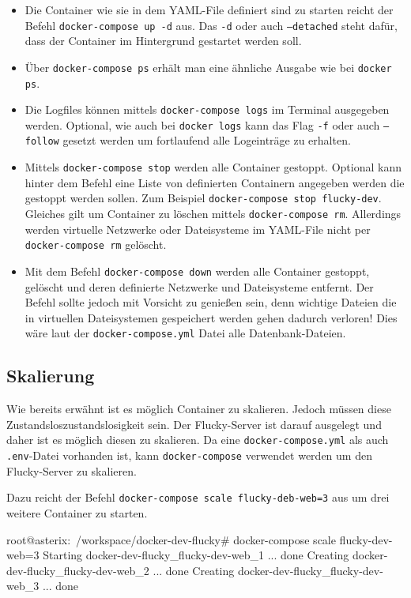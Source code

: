 \begin{itemize}[itemsep=0pt]
  \item Die Container wie sie in dem YAML-File definiert sind zu starten reicht der Befehl \texttt{docker-compose up -d} aus. Das \texttt{-d} oder auch \texttt{--detached} steht dafür, dass der Container im Hintergrund gestartet werden soll.
  \item Über \texttt{docker-compose ps} erhält man eine ähnliche Ausgabe wie bei \texttt{docker ps}.
  \item Die Logfiles können mittels \texttt{docker-compose logs} im Terminal ausgegeben werden. Optional, wie auch bei \texttt{docker logs} kann das Flag \texttt{-f} oder auch \texttt{--follow} gesetzt werden um fortlaufend alle Logeinträge zu erhalten.
  \item Mittels \texttt{docker-compose stop} werden alle Container gestoppt. Optional kann hinter dem Befehl eine Liste von definierten Containern angegeben werden die gestoppt werden sollen. Zum Beispiel \texttt{docker-compose stop flucky-dev}. Gleiches gilt um Container zu löschen mittels \texttt{docker-compose rm}. Allerdings werden virtuelle Netzwerke oder Dateisysteme im YAML-File nicht per \texttt{docker-compose rm} gelöscht.
  \item Mit dem Befehl \texttt{docker-compose down} werden alle Container gestoppt, gelöscht und deren definierte Netzwerke und Dateisysteme entfernt. Der Befehl sollte jedoch mit Vorsicht zu genießen sein, denn wichtige Dateien die in virtuellen Dateisystemen gespeichert werden gehen dadurch verloren! Dies wäre laut der \texttt{docker-compose.yml} Datei alle Datenbank-Dateien.
\end{itemize}

\subsection{Skalierung}%
\label{sec:docker-compose.skalierung}

Wie bereits erwähnt ist es möglich Container zu skalieren. Jedoch müssen diese
Zustandslos\footnotesize{zustandslosigkeit} sein. Der Flucky-Server ist darauf
ausgelegt und daher ist es möglich diesen zu skalieren. Da eine
\texttt{docker-compose.yml} als auch \texttt{.env}-Datei vorhanden ist, kann
\texttt{docker-compose} verwendet werden um den Flucky-Server zu skalieren.

Dazu reicht der Befehl \texttt{docker-compose scale flucky-deb-web=3} aus um
drei weitere Container zu starten.

\begin{bashcode}
  root@asterix:~/workspace/docker-dev-flucky# docker-compose scale flucky-dev-web=3
  Starting docker-dev-flucky_flucky-dev-web_1 ... done
  Creating docker-dev-flucky_flucky-dev-web_2 ... done
  Creating docker-dev-flucky_flucky-dev-web_3 ... done
\end{bashcode}
